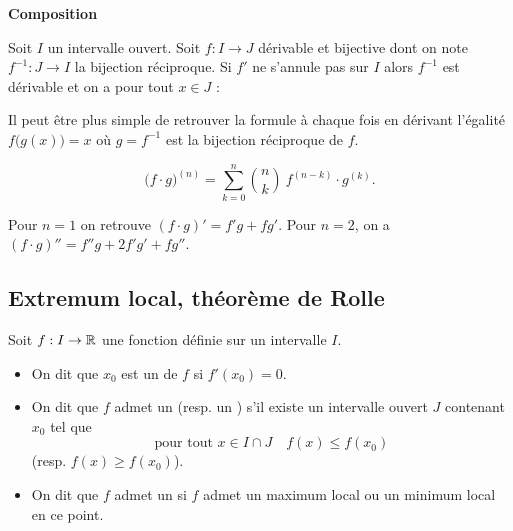 \documentclass[10pt,class=article,crop=false]{standalone}
\begin{document}
\begin{multicols}{2}
\textbf{Composition}




\begin{corollaire}
	Soit $I$ un intervalle ouvert. Soit $f : I \to J$ dérivable et bijective dont on note
	$f^{-1} : J \to I$ la bijection réciproque. Si $f'$ ne s'annule pas sur $I$ alors $f^{-1}$ est dérivable
	et on a pour tout $x \in J$ :
\end{corollaire}



Il peut être plus simple de retrouver la formule à chaque fois
en dérivant l'égalité $f\big( g(x) \big)  = x$
où $g=f^{-1}$ est la bijection réciproque de $f$.



\begin{theoreme}
	\sauteligne	
	$$\big( f \cdot g \big)^{(n)} = \sum_{k=0}^n \binom{n}{k} \ f^{(n-k)} \cdot g^{(k)}.$$
\end{theoreme}

Pour $n=1$ on retrouve $(f\cdot g)'= f' g + f g'$.
Pour $n=2$, on a $(f\cdot g)''= f''g + 2f' g' + fg''$.



\subsection{Extremum local, théorème de Rolle}


Soit $f : I \to \mathbb{R}$ une fonction définie sur un intervalle $I$.
	\begin{itemize}
		\item On dit que $x_0$ est un  de $f$ si $f'(x_0)=0$.
		
		\item On dit que $f$ admet un  (resp. un ) s'il existe un intervalle ouvert $J$ contenant $x_0$  tel que
		$$\text{pour tout } x\in I \cap J \quad f(x) \le f(x_0)$$
		(resp. $f(x) \ge f(x_0)$).
		\item On dit que $f$ admet un  si $f$ admet un maximum
		local ou un minimum local en ce point.
	\end{itemize}



\end{multicols}
\end{document}
